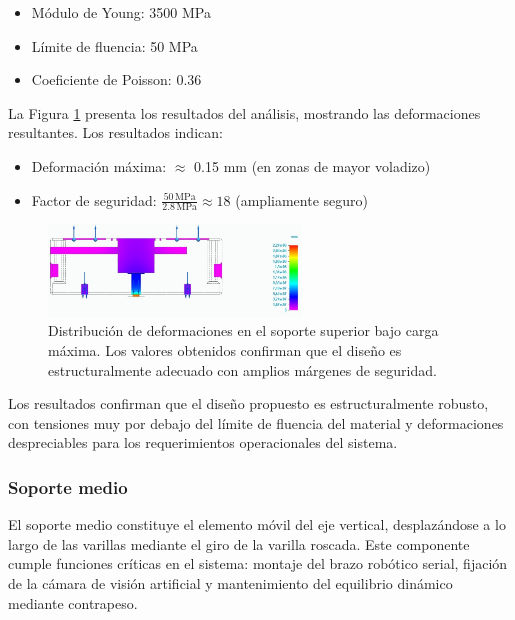 \begin{itemize}[label=$\bullet$]
    \item Módulo de Young: 3500 MPa
    \item Límite de fluencia: 50 MPa
    \item Coeficiente de Poisson: 0.36
\end{itemize}

La Figura \ref{fig:SuperiorReal_simplificado_tensiones} presenta los resultados del análisis, mostrando las deformaciones resultantes. Los resultados indican:

\begin{itemize}[label=$\bullet$]
    \item Deformación máxima: $\approx$ 0.15 mm (en zonas de mayor voladizo)
    \item Factor de seguridad: $\frac{50\,\text{MPa}}{2.8\,\text{MPa}} \approx 18$ (ampliamente seguro)
\end{itemize}

\begin{figure}[H]
    \centering
    \includegraphics[width=0.6\textwidth]{img/SuperiorReal_simplificado_tensiones.jpg}
    \caption{Distribución de deformaciones en el soporte superior bajo carga máxima. Los valores obtenidos confirman que el diseño es estructuralmente adecuado con amplios márgenes de seguridad.}
    \label{fig:SuperiorReal_simplificado_tensiones}
\end{figure}

Los resultados confirman que el diseño propuesto es estructuralmente robusto, con tensiones muy por debajo del límite de fluencia del material y deformaciones despreciables para los requerimientos operacionales del sistema.

\subsubsection{Soporte medio}

El soporte medio constituye el elemento móvil del eje vertical, desplazándose a lo largo de las varillas mediante el giro de la varilla roscada. Este componente cumple funciones críticas en el sistema: montaje del brazo robótico serial, fijación de la cámara de visión artificial y mantenimiento del equilibrio dinámico mediante contrapeso.

